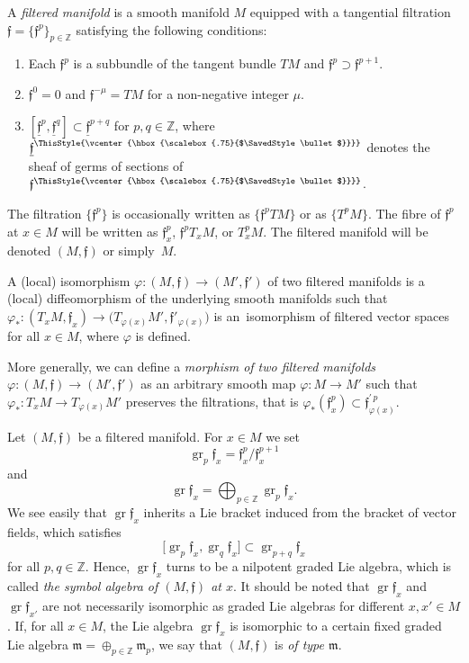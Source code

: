 \documentclass[10pt,a4paper]{amsart}
\newcommand\sbullet[1][.75]{\mathbin{\ThisStyle{\vcenter{\hbox{%
					\scalebox{#1}{$\SavedStyle\bullet$}}}}}%
}
\newcommand{\Z}{\mathbb Z}
\newcommand{\f}{\mathfrak f}
\newcommand{\uf}{\underline{\f}}
\newcommand{\m}{\mathfrak m}
\newcommand{\gr}{\operatorname{gr}}
\numberwithin{equation}{section}
\begin{document}
A \emph{filtered manifold} is a smooth manifold $M$ equipped with a tangential filtration $\f=\{\f^p\}_{p\in\Z}$ satisfying the following conditions:
\begin{enumerate}\itemsep=0pt
	\item[$(i)$] Each $\f^p$ is a subbundle of the tangent bundle $TM$ and $\f^p\supset \f^{p+1}$.
	\item[$(ii)$] $\f^0=0$ and $\f^{-\mu}=TM$ for a non-negative integer $\mu$.
	\item[$(iii)$] $[\uf^p,\uf^q]\subset\uf^{p+q}$ for $p,q\in\Z$, where $\uf^{\sbullet}$ denotes the sheaf of germs of sections of $\f^{\sbullet}$.
\end{enumerate}
The filtration $\{\f^p\}$ is occasionally written as $\{\f^pTM\}$ or as $\{T^pM\}$. The fibre of
$\f^p$ at $x\in M$ will be written as $\f^p_x$, $\f^pT_xM$, or $T^p_xM$. The filtered manifold will be denoted $(M,\f)$ or simply~$M$.

A (local) isomorphism $\varphi\colon (M,\f)\to (M',\f')$ of two filtered manifolds is a (local) diffeomorphism of the underlying smooth manifolds such that
$\varphi_*\colon (T_xM, \f_x) \to \big(T_{\varphi(x)}M', \f'_{\varphi(x)}\big)$ is an~iso\-mor\-phism of filtered vector spaces for all $x\in M$, where $\varphi$ is defined.

More generally, we can define a \emph{morphism of two filtered manifolds} $\varphi\colon (M,\f)\to (M',\f')$ as an arbitrary smooth map $\varphi\colon M\to M'$ such that $\varphi_*\colon T_x M\to T_{\varphi(x)} M'$ preserves the filtrations, that is $\varphi_*(\f_x^p)\subset \f^{\prime\,p}_{\varphi(x)}$.

Let $(M,\f)$ be a filtered manifold. For $x\in M$ we set
\[
\gr_p\f_x = \f^p_x/\f^{p+1}_x
\]
and
\[
\gr \f_x =\bigoplus_{p\in \Z} \gr_p\f_x.
\]
We see easily that $\gr\f_x$ inherits a Lie bracket induced from the bracket of vector fields, which satisfies
\[
\big[\gr_p\f_x,\gr_q\f_x\big]\subset \gr_{p+q}\f_x
\]
for all $p,q\in\Z$. Hence, $\gr\f_x$ turns to be a nilpotent graded Lie algebra, which is called \emph{the symbol algebra of $(M,\f)$ at $x$}. It should be noted that $\gr\f_x$ and $\gr\f_{x'}$ are not necessarily isomorphic as graded Lie algebras for different $x,x'\in M$. If, for all $x\in M$, the Lie algebra $\gr\f_x$ is isomorphic to a certain fixed graded Lie algebra $\m=\oplus_{p\in\Z}\m_p$, we say that $(M,\f)$ is \emph{of type $\m$}.
\end{document}
